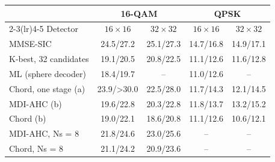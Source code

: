 \begin{tabular}{@{}lcccc@{}}
\toprule
 & \multicolumn{2}{c}{16-QAM} & \multicolumn{2}{c}{QPSK}\\
\cmidrule(lr){2-3}\cmidrule(lr){4-5}
Detector & $16\times16$ & $32\times32$ & $16\times16$ & $32\times32$\\
\midrule
MMSE-SIC & 24.5/27.2 & 25.1/27.3 & 14.7/16.8 & 14.9/17.1\\
K-best, 32 candidates & 19.1/20.5 & 20.8/22.5 & 11.1/12.6 & 11.6/12.8\\
ML (sphere decoder) & 18.4/19.7 & -- & 11.0/12.6 & --\\
Chord, one stage (a) & 23.9/>30.0 & 22.5/28.0 & 11.7/14.3 & 12.1/14.5\\
MDI-AHC (b) & 19.6/22.8 & 20.3/22.8 & 11.8/13.7 & 13.2/15.2\\
Chord (b) & 19.0/22.1 & 18.6/20.8 & 11.1/12.6 & 10.6/12.1\\
MDI-AHC, Ns = 8 & 21.8/24.6 & 23.0/25.6 & -- & --\\
Chord, Ns = 8 & 21.1/24.2 & 20.9/23.6 & -- & --\\
\bottomrule
\end{tabular}
